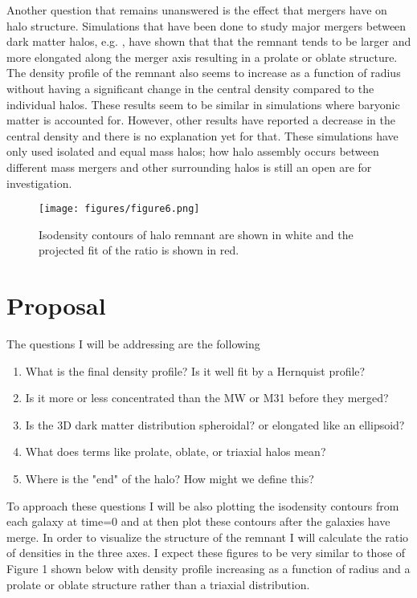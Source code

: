 \documentclass{aastex62}
\begin{document}
Another question that remains unanswered is the effect that mergers have on halo structure. Simulations that have been done to study major mergers between dark matter halos, e.g. \cite{Drakos119}, have shown that that the remnant tends to be larger and more elongated along the merger axis resulting in a prolate or oblate structure.  The density profile of the remnant also seems to increase as a function of radius without having a significant change in the central density compared to the individual halos. These results seem to be similar in simulations where baryonic matter is accounted for. However, other results have reported a decrease in the central density and there is no explanation yet for that. These simulations have only used isolated and equal mass halos; how halo assembly occurs between different mass mergers and other surrounding halos is still an open are for investigation.  \citep{Drakos219}

 \begin{figure}[h!]
  \centering
     \texttt{[image: figures/figure6.png]}
     \caption{\cite{Drakos119} Isodensity contours of halo remnant are shown in white and the projected fit of the ratio is shown in red.}
      \end{figure}
 
\section{Proposal} \label{sec:proposal}

The questions I will be addressing are the following
\begin{enumerate}
\item What is the final density profile? Is it well fit by a Hernquist profile? 
\item Is it more or less concentrated than the MW or M31 before they merged?
\item Is the 3D dark matter distribution spheroidal? or elongated like an ellipsoid? 
\item What does terms like prolate, oblate, or triaxial halos mean? 
\item Where is the "end" of the halo? How might we define this?
\end{enumerate}

To approach these questions I will be also plotting the isodensity contours from each galaxy at time=0 and at then plot these contours after the galaxies have merge. In order to visualize the structure of the remnant I will calculate the ratio of densities in the three axes. I expect these figures to be very similar to those of Figure 1 shown below with density profile increasing as a function of radius and a prolate or oblate structure rather than a triaxial distribution.
\end{document}
